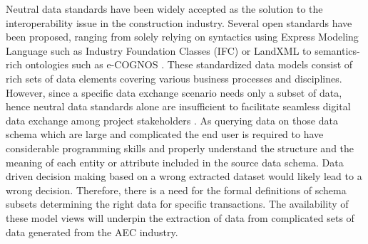 \documentclass[Journal, InsideFigs, DoubleSpace]{ascelike} %
\begin{document}
Neutral data standards have been widely accepted as the solution to the interoperability issue in the construction industry. Several open standards have been proposed, ranging from solely relying on syntactics using Express Modeling Language such as Industry Foundation Classes (IFC) \cite{buildingsmart} or LandXML \cite{landxmlorg} to semantics-rich ontologies such as e-COGNOS \cite{Lima05}. These standardized data models consist of rich sets of data elements covering various business processes and disciplines. However, since a specific data exchange scenario needs only a subset of data, hence neutral data standards alone are insufficient to facilitate seamless digital data exchange among project stakeholders \cite{Froese03,east12}. As querying data on those data schema which are large and complicated the end user is required to have considerable programming skills and properly understand the structure and the meaning of each entity or attribute included in the source data schema. Data driven decision making based on a wrong extracted dataset would likely lead to a wrong decision. Therefore, there is a need for the formal definitions of schema subsets determining the right data for specific transactions. The availability of these model views will underpin the extraction of data from complicated sets of data generated from the AEC industry. 
\par
\end{document}
